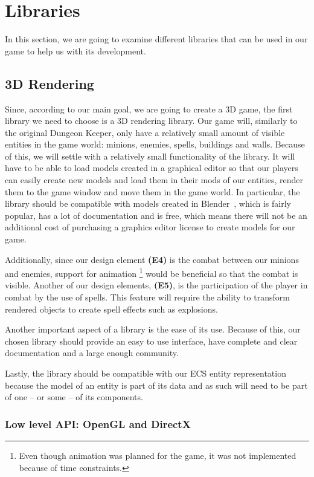 \section{Libraries}

In this section, we are going to examine different libraries that can be used in our game
to help us with its development.

\subsection{3D Rendering}

Since, according to our main goal, we are going to create a 3D game, the first library we need to choose is a 3D rendering library.
Our game will, similarly to the original Dungeon Keeper, only have a relatively small amount of visible entities in the game world: 
minions, enemies, spells, buildings and walls. Because of this, we will settle with a relatively small functionality of the library.
It will have to be able to load models created in a graphical editor so that our players can easily create new models and load them
in their mods  of our entities, render them to the game window and move them in the game world. In particular, the library should be
compatible with models created in Blender~\cite{Blender}, which is fairly popular, has a lot of documentation and is free, which means
there will not be an additional cost of purchasing a graphics editor license to create models for our game.

Additionally, since our design element \textbf{(E4)} is the combat between our minions and enemies, support for animation
\footnote{Even though animation was planned for the game, it was not implemented because of time constraints.} would be
beneficial so that the combat is visible. Another of our design elements, \textbf{(E5)}, is the participation of the player in combat
by the use of spells. This feature will require the ability to transform rendered objects to create spell effects such as explosions.

Another important aspect of a library is the ease of its use. Because of this, our chosen library should provide an easy to use
interface, have complete and clear documentation and a large enough community.

Lastly, the library should be compatible with our ECS entity representation because the model of an entity is part of its data and
as such will need to be part of one -- or some -- of its components.

\subsubsection{Low level API: OpenGL and DirectX}

